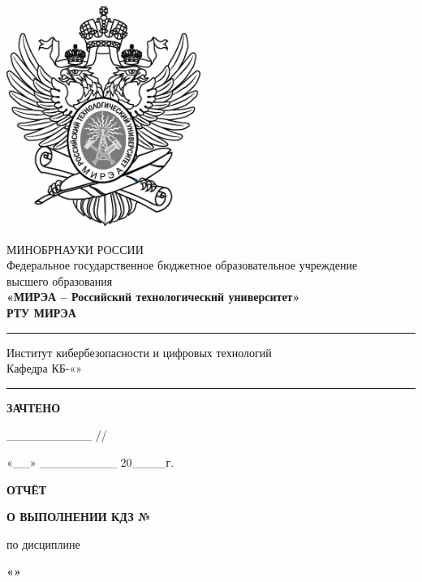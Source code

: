 \fontsize{12}{12}\selectfont
\linespread{1}
\begin{center}
    \includegraphics[scale=0.5]{./title/title.png}
    
    МИНОБРНАУКИ РОССИИ\\
    Федеральное государственное бюджетное образовательное учреждение\\
    высшего образования\\
    \textbf{«МИРЭА -- Российский технологический университет»}\\
    \textbf{РТУ МИРЭА}\\
    \noindent\rule{\textwidth}{1pt}
    Институт кибербезопасности и цифровых технологий\\
    Кафедра КБ-\kafedranum «\kafedraname»\\ 
    \noindent\rule{\textwidth}{1pt}
    \end{center} 
    \vspace{12pt}
    
    \begin{flushright}
    \textbf {ЗАЧТЕНО}
    
    \_\_\_\_\_\_\_\_\_\_ /\prepodname /
    
    «\_\_» \_\_\_\_\_\_\_\_\_ 20\_\_\_\_г.
    
    \end{flushright}
    \linespread{1.5}
    \vspace{12pt}
    \fontsize{14}{14}\selectfont
    \begin {center}
    \textbf{ОТЧЁТ}
    
    \textbf{О ВЫПОЛНЕНИИ КДЗ №\themename}
    
    по дисциплине
    
    \textbf{«\discname»}
    
    \end {center}

